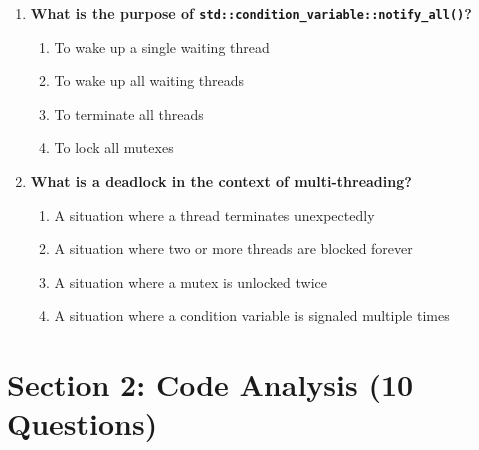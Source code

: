 \documentclass[12pt]{article}
\begin{document}
\begin{enumerate}
    \item \textbf{What is the purpose of \texttt{std::condition\_variable::notify\_all()}?}
    \begin{enumerate}[label=(\alph*)]
        \item To wake up a single waiting thread
        \item To wake up all waiting threads
        \item To terminate all threads
        \item To lock all mutexes
    \end{enumerate}

    \item \textbf{What is a deadlock in the context of multi-threading?}
    \begin{enumerate}[label=(\alph*)]
        \item A situation where a thread terminates unexpectedly
        \item A situation where two or more threads are blocked forever
        \item A situation where a mutex is unlocked twice
        \item A situation where a condition variable is signaled multiple times
    \end{enumerate}
\end{enumerate}

\section*{Section 2: Code Analysis (10 Questions)}
\end{document}
